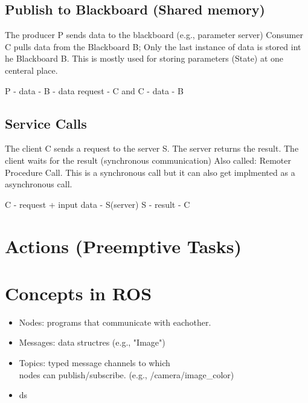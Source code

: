 \documentclass[]{report}
\begin{document}
\begin{itemize}
        \subsection*{Publish to Blackboard (Shared memory)}
        The producer P sends data to the blackboard (e.g., parameter server)
        Consumer C pulls data from the Blackboard B; Only the last instance of data is stored int he Blackboard B.
        This is mostly used for storing parameters (State) at one centeral place.

        P - data - B - data request - C and C - data - B

        \subsection*{Service Calls}
        The client C sends a request to the server S. The server returns the result. The client waits for the result (synchronous communication)
        Also called: Remoter Procedure Call. This is a synchronous call but it can also get implmented as a asynchronous call.

        C - request + input data - S(server)
        S - result - C

        \section{Actions (Preemptive Tasks)}


        \section{ Concepts in ROS}
        \begin{itemize}
            \item Nodes: programs that communicate with eachother.
            \item Messages: data structres (e.g., "Image")
            \item Topics: typed message channels to which \\ nodes can publish/subscribe.  (e.g., /camera/image\_color)
            \item ds
        \end{itemize}

    \end{itemize}
\end{document}
